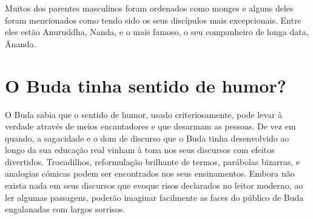 \enlargethispage{\baselineskip}

Muitos dos parentes masculinos foram ordenados como monges e alguns
deles foram mencionados como tendo sido os seus discípulos mais
excepcionais. Entre eles estão Anuruddha, Nanda, e o mais famoso, o seu
companheiro de longa data, Ānanda.

\section{O Buda tinha sentido de humor?}

O Buda sabia que o sentido de humor, usado criteriosamente, pode levar à
verdade através de meios encantadores e que desarmam as pessoas. De vez
em quando, a sagacidade e o dom de discurso que o Buda tinha
desenvolvido ao longo da sua educação real vinham à tona nos seus
discursos com efeitos divertidos. Trocadilhos, reformulação brilhante de
termos, parábolas bizarras, e analogias cómicas podem ser encontrados
nos seus ensinamentos. Embora não exista nada em seus discursos que
evoque risos declarados no leitor moderno, ao ler algumas passagens,
poderão imaginar facilmente as faces do público de Buda engalanadas com
largos sorrisos.
